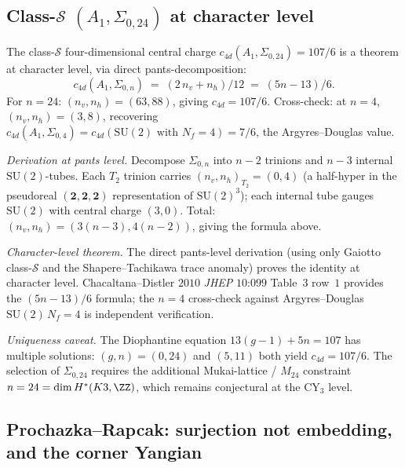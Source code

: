 \subsection{Class-$\mathcal{S}$ $(A_1, \Sigma_{0, 24})$ at character
level}
\label{wn:subsec:second-pass-class-S}

\begin{theorem}[Character-level $c_{4d}(A_1, \Sigma_{0,24}) = 107/6$]
\label{wn:thm:second-pass-class-S-107-6}

The class-$\mathcal{S}$ four-dimensional central charge
$c_{4d}(A_1, \Sigma_{0, 24}) = 107/6$ is a theorem at character level,
via direct pants-decomposition:
\[
c_{4d}(A_1, \Sigma_{0, n}) \;=\; (2\,n_v + n_h)/12
\;=\; (5n - 13)/6.
\]
For $n = 24$: $(n_v, n_h) = (63, 88)$, giving $c_{4d} = 107/6$.
Cross-check: at $n = 4$, $(n_v, n_h) = (3, 8)$, recovering
$c_{4d}(A_1, \Sigma_{0, 4}) = c_{4d}(\mathrm{SU}(2)\text{ with }
N_f = 4) = 7/6$, the Argyres--Douglas value.

\emph{Derivation at pants level.} Decompose $\Sigma_{0, n}$ into
$n - 2$ trinions and $n - 3$ internal $\mathrm{SU}(2)$-tubes. Each
$T_2$ trinion carries $(n_v, n_h)_{T_2} = (0, 4)$ (a half-hyper in the
pseudoreal $(\mathbf{2}, \mathbf{2}, \mathbf{2})$ representation of
$\mathrm{SU}(2)^3$); each internal tube gauges
$\mathrm{SU}(2)$ with central charge $(3, 0)$. Total:
$(n_v, n_h) = (3(n-3), 4(n-2))$, giving the formula above.

\emph{Character-level theorem.} The direct pants-level derivation
(using only Gaiotto class-$\mathcal{S}$ and the Shapere--Tachikawa
trace anomaly) proves the identity at character level.
Chacaltana--Distler $2010$ \emph{JHEP} $10$:$099$ Table~$3$
row~$1$ provides the $(5n - 13)/6$ formula; the $n = 4$ cross-check
against Argyres--Douglas $\mathrm{SU}(2)\,N_f = 4$ is independent
verification.

\emph{Uniqueness caveat.} The Diophantine equation
$13(g - 1) + 5n = 107$ has multiple solutions: $(g, n) = (0, 24)$ and
$(5, 11)$ both yield $c_{4d} = 107/6$. The selection of
$\Sigma_{0, 24}$ requires the additional Mukai-lattice / $M_{24}$
constraint $n = 24 = \dim H^*(K3, \ZZ)$, which remains conjectural at
the CY$_3$ level.
\end{theorem}

\subsection{Prochazka--Rapcak: surjection not embedding, and the corner
Yangian}
\label{wn:subsec:second-pass-PR}

